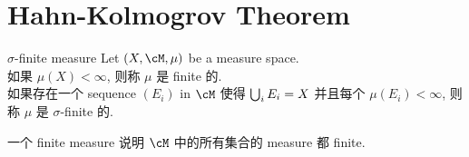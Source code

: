 \documentclass[lang=cn,11pt]{elegantbook}
\begin{document}
\section{Hahn-Kolmogrov Theorem}
\begin{definition}{$\sigma$-finite measure}
Let $(X,\cM, \mu)$ be a measure space.\\
如果 $\mu(X) < \infty$, 则称 $\mu$ 是 finite 的.\\
如果存在一个 sequence $(E_i)$ in $\cM$ 使得 $\bigcup_{i} E_i = X$ 并且每个 $\mu(E_i) < \infty$, 则称 $\mu$ 是 $\sigma$-finite 的.
\end{definition}
\begin{remark}
一个 finite measure 说明 $\cM$ 中的所有集合的 measure 都 finite.
\end{remark}
\end{document}
